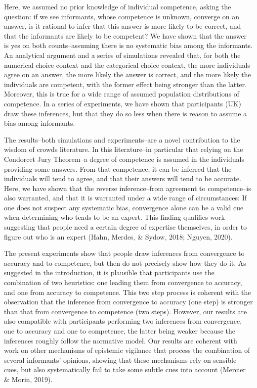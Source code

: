 \documentclass[
  doc,floatsintext]{apa6}
\begin{document}
Here, we assumed no prior knowledge of individual competence, asking the question: if we see informants, whose competence is unknown, converge on an answer, is it rational to infer that this answer is more likely to be correct, and that the informants are likely to be competent? We have shown that the answer is yes on both counts--assuming there is no systematic bias among the informants. An analytical argument and a series of simulations revealed that, for both the numerical choice context and the categorical choice context, the more individuals agree on an answer, the more likely the answer is correct, and the more likely the individuals are competent, with the former effect being stronger than the latter. Moreover, this is true for a wide range of assumed population distributions of competence. In a series of experiments, we have shown that participants (UK) draw these inferences, but that they do so less when there is reason to assume a bias among informants.

The results--both simulations and experiments--are a novel contribution to the wisdom of crowds literature. In this literature--in particular that relying on the Condorcet Jury Theorem--a degree of competence is assumed in the individuals providing some answers. From that competence, it can be inferred that the individuals will tend to agree, and that their answers will tend to be accurate. Here, we have shown that the reverse inference--from agreement to competence--is also warranted, and that it is warranted under a wide range of circumstances: If one does not suspect any systematic bias, convergence alone can be a valid cue when determining who tends to be an expert. This finding qualifies work suggesting that people need a certain degree of expertise themselves, in order to figure out who is an expert (Hahn, Merdes, \& Sydow, 2018; Nguyen, 2020).

The present experiments show that people draw inferences from convergence to accuracy and to competence, but then do not precisely show how they do it. As suggested in the introduction, it is plausible that participants use the combination of two heuristics: one leading them from convergence to accuracy, and one from accuracy to competence. This two step process is coherent with the observation that the inference from convergence to accuracy (one step) is stronger than that from convergence to competence (two steps). However, our results are also compatible with participants performing two inferences from convergence, one to accuracy and one to competence, the latter being weaker because the inferences roughly follow the normative model. Our results are coherent with work on other mechanisms of epistemic vigilance that process the combination of several informants' opinions, showing that these mechanisms rely on sensible cues, but also systematically fail to take some subtle cues into account (Mercier \& Morin, 2019).
\end{document}
